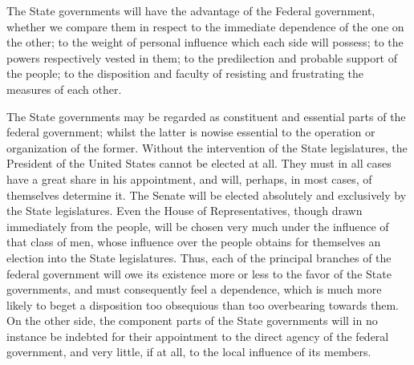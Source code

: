 The State governments will have the advantage of the Federal government, whether we compare them in respect to the immediate dependence of the one on the other; to the weight of personal influence which each side will possess; to the powers respectively vested in them; to the predilection and probable support of the people; to the disposition and faculty of resisting and frustrating the measures of each other.

The State governments may be regarded as constituent and essential parts of the federal government; whilst the latter is nowise essential to the operation or organization of the former. Without the intervention of the State legislatures, the President of the United States cannot be elected at all. They must in all cases have a great share in his appointment, and will, perhaps, in most cases, of themselves determine it. The Senate will be elected absolutely and exclusively by the State legislatures. Even the House of Representatives, though drawn immediately from the people, will be chosen very much under the influence of that class of men, whose influence over the people obtains for themselves an election into the State legislatures. Thus, each of the principal branches of the federal government will owe its existence more or less to the favor of the State governments, and must consequently feel a dependence, which is much more likely to beget a disposition too obsequious than too overbearing towards them. On the other side, the component parts of the State governments will in no instance be indebted for their appointment to the direct agency of the federal government, and very little, if at all, to the local influence of its members.

